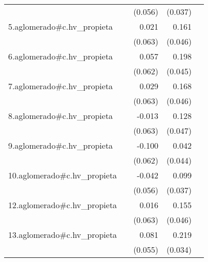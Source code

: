 {\begin{longtable}{l*{4}{D{.}{.}{-1}}}
            &                     &     (0.056)         &     (0.037)         &                     \\
\addlinespace
5.aglomerado#c.hv\_propieta&                     &       0.021         &       0.161\sym{***}&                     \\
            &                     &     (0.063)         &     (0.046)         &                     \\
\addlinespace
6.aglomerado#c.hv\_propieta&                     &       0.057         &       0.198\sym{***}&                     \\
            &                     &     (0.062)         &     (0.045)         &                     \\
\addlinespace
7.aglomerado#c.hv\_propieta&                     &       0.029         &       0.168\sym{***}&                     \\
            &                     &     (0.063)         &     (0.046)         &                     \\
\addlinespace
8.aglomerado#c.hv\_propieta&                     &      -0.013         &       0.128\sym{**} &                     \\
            &                     &     (0.063)         &     (0.047)         &                     \\
\addlinespace
9.aglomerado#c.hv\_propieta&                     &      -0.100         &       0.042         &                     \\
            &                     &     (0.062)         &     (0.044)         &                     \\
\addlinespace
10.aglomerado#c.hv\_propieta&                     &      -0.042         &       0.099\sym{**} &                     \\
            &                     &     (0.056)         &     (0.037)         &                     \\
\addlinespace
12.aglomerado#c.hv\_propieta&                     &       0.016         &       0.155\sym{***}&                     \\
            &                     &     (0.063)         &     (0.046)         &                     \\
\addlinespace
13.aglomerado#c.hv\_propieta&                     &       0.081         &       0.219\sym{***}&                     \\
            &                     &     (0.055)         &     (0.034)         &                     \\

\end{longtable}}
